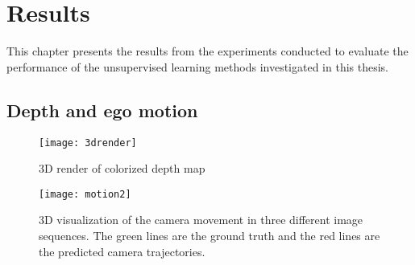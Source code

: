 \chapter{Results}\label{cha:results}

This chapter presents the results from the experiments conducted to evaluate the performance of the unsupervised learning methods investigated in this thesis. 

\section{Depth and ego motion}

\begin{figure}[H]
	\centering
	\texttt{[image: 3drender]}
	\caption{3D render of colorized depth map}
	\label{fig:3drender}
\end{figure}

\begin{figure}[H]
	\centering
	\texttt{[image: motion2]}
	\caption{3D visualization of the camera movement in three different image sequences. The green lines are the ground truth and the red lines are the predicted camera trajectories.}
	\label{fig:movement}
\end{figure}



